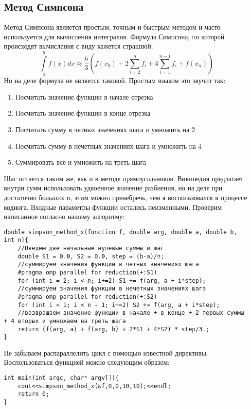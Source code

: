 \documentclass{article}
\begin{document}
\subsection{Метод Симпсона}
Метод Симпсона является простым, точным и быстрым методом и часто используется для
вычисления интегралов. Формула Симпсона, по которой происходят вычисления с виду кажется страшной:
$$\int\limits_a^b f(x)dx \approx \frac{h}{3}(f(x_0)+2\sum_{i=2}^{n} f_i+4\sum_{i=1}^{n-1} f_i+f(x_n))$$
Но на деле формула не является таковой. Простым языком это звучит так:
\begin{enumerate}
    \item Посчитать значение функции в начале отрезка
    \item Посчитать значение функции в конце отрезка
    \item Посчитать сумму в четных значениях шага и умножить на 2
    \item Посчитать сумму в нечетных значениях шага и умножить на 4
    \item Суммировать всё и умножить на треть шага
\end{enumerate}
Шаг остается таким же, как и в методе прямоугольников.
Википедия предлагает внутри сумм использовать удвоенное значение разбиения, но на деле при достаточно больших n, этим можно пренебречь, чем я воспользовался в процессе кодинга. Входные параметры функции остались неизменными. Проверим написанное согласно нашему алгоритму:
\begin{lstlisting}
double simpson_method_x(function f, double arg, double a, double b, int n){
    //Введем две начальные нулевые суммы и шаг
    double S1 = 0.0, S2 = 0.0, step = (b-a)/n;
    //суммируем значения функции в четных значениях шага
    #pragma omp parallel for reduction(+:S1)
    for (int i = 2; i < n; i+=2) S1 += f(arg, a + i*step);
    //суммируем значения функции в нечетных значениях шага
    #pragma omp parallel for reduction(+:S2)
    for (int i = 1; i < n - 1; i+=2) S2 += f(arg, a + i*step);
    //возвращаем значение функции в начале + в конце + 2 первых суммы + 4 вторых и умножаем на треть шага
    return (f(arg, a) + f(arg, b) + 2*S1 + 4*S2) * step/3.;
}
\end{lstlisting}
Не забываем распараллелить цикл с помощью известной директивы.
Воспользоваться функцией можно следующим образом:
\begin{lstlisting}
int main(int argc, char* argv[]){
    cout<<simpson_method_x(&f,0,0,10,10);<<endl;
    return 0;
}
\end{lstlisting}
\end{document}
